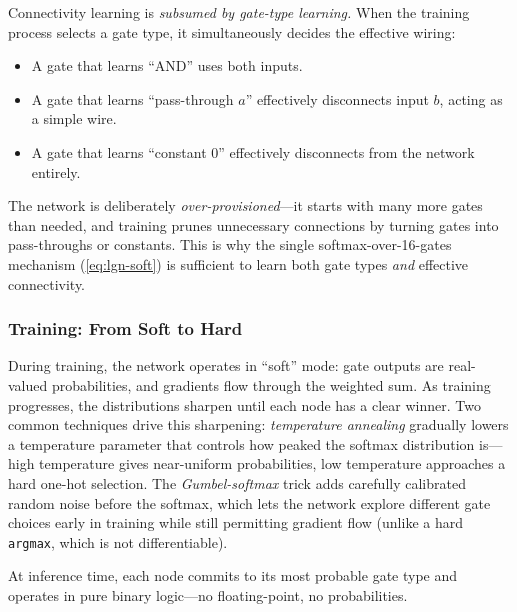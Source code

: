 \begin{keyinsight}
Connectivity learning is \emph{subsumed by gate-type learning.} When
the training process selects a gate type, it simultaneously decides
the effective wiring:
\begin{itemize}[leftmargin=1em]
  \item A gate that learns ``AND'' uses both inputs.
  \item A gate that learns ``pass-through $a$'' effectively
    disconnects input $b$, acting as a simple wire.
  \item A gate that learns ``constant 0'' effectively disconnects
    from the network entirely.
\end{itemize}
The network is deliberately \emph{over-provisioned}---it starts with
many more gates than needed, and training prunes unnecessary
connections by turning gates into pass-throughs or constants.
This is why the single softmax-over-16-gates mechanism
(\cref{eq:lgn-soft}) is sufficient to learn both gate types
\emph{and} effective connectivity.
\end{keyinsight}

\subsubsection{Training: From Soft to Hard}

During training, the network operates in ``soft'' mode: gate outputs
are real-valued probabilities, and gradients flow through the weighted
sum. As training progresses, the distributions sharpen until each node
has a clear winner. Two common techniques drive this sharpening:
\emph{temperature annealing} gradually lowers a temperature parameter
that controls how peaked the softmax distribution is---high temperature
gives near-uniform probabilities, low temperature approaches a hard
one-hot selection. The \emph{Gumbel-softmax} trick adds carefully
calibrated random noise before the softmax, which lets the network
explore different gate choices early in training while still permitting
gradient flow (unlike a hard \texttt{argmax}, which is not
differentiable).

At inference time, each node commits to its most probable gate type
and operates in pure binary logic---no floating-point, no
probabilities.

